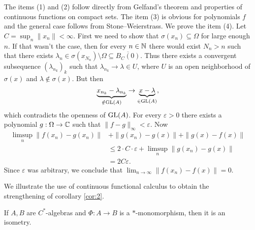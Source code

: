 \begin{myproof}
  The items (1) and (2) follow directly from Gelfand's theorem and properties of continuous functions  
  on compact sets. The item (3) is obvious for polynomials $f$ and the general case follows from Stone--Weierstrass.
  We prove the item (4). Let $C = \sup_n \|x_n\| < \infty$. First we need to show that 
  $\sigma(x_n) \subseteq \Omega$ for large enough $n$. If that wasn't the case, then for every $n \in \mathbb {N}$ there would exist $N_n > n$
  such that there exists $\lambda_n \in \sigma(x_{N_n}) \setminus \Omega \subseteq \overline{B_C (0)}$.
  Thus there exists a convergent subsequence $(\lambda_{n_k})_k$ such that $\lambda_{n_k} \to \lambda \in U$,
  where $U$ is an open neighborhood of $\sigma(x)$
  and $\lambda \notin \sigma(x)$. But then $$\underbrace{x_{n_k} - \lambda_{n_k}}_{\notin \operatorname{GL}(A)} \to \underbrace{x - \lambda}_{\in \operatorname{GL}(A)},$$
  which contradicts the openness of $\operatorname{GL}(A)$. For every $\varepsilon > 0$ there exists a polynomial $g: \Omega \to \mathbb {C}$ such that $\|f - g\|_{\infty} < \varepsilon$.
  Now \begin{align*}
    \limsup_{n} \|f(x_n) - g(x_n)\| &+ \|g(x_n) - g(x)\| + \|g(x) - f(x)\|\\
     &\leq 2 \cdot C \cdot \varepsilon + \limsup_{n} \|g(x_n) - g(x)\| \\
     &= 2 C\varepsilon.
  \end{align*}
  Since $\varepsilon$ was arbitrary, we conclude that $\lim_{n \to \infty} \| f(x_n) - f(x)\| = 0$.
\end{myproof}

We illustrate the use of continuous functional calculus to obtain the strengthening of corollary \ref{cor:2}.

\begin{corollary}
    If $A, B$ are $C^*$-algebras and $\Phi: A \to B$ is a $*$-monomorphism,
    then it is an isometry.
\end{corollary}

